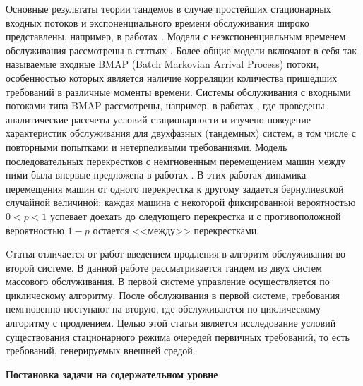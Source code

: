 \documentclass[a4paper,twoside]{article}
\newcommand{\header}[1]{\bigskip\medskip\noindent\textbf{#1}\nopagebreak\bigskip}
\theoremstyle{theorem}
\theoremstyle{remark}
\begin{document}
Основные результаты теории тандемов в случае простейших стационарных входных потоков и экспоненциального времени обслуживания широко представлены, например, в работах \cite{Balsamo:2003, Gnedenko:Konig:1983, Perros:1994}. Модели с неэкспоненциальным временем обслуживания рассмотрены в статьях \cite{Gomez:2002:1, Gomez:2002:2, Gomez:2002:3}. Более общие модели включают в себя так называемые входные BMAP (Batch Markovian Arrival Process) потоки, особенностью которых является наличие корреляции количества пришедших требований в различные моменты времени. Системы обслуживания с входными потоками типа BMAP рассмотрены, например, в работах \cite{Klimenok:Dudin:2005, Klimenok:2010, Klimenok:2015}, где проведены аналитические рассчеты условий стационарности и изучено поведение характеристик обслуживания для двухфазных (тандемных) систем, в том числе с повторными попытками и нетерпеливыми требованиями. 
Модель последовательных перекрестков с немгновенным перемещением машин между ними была впервые предложена в работах \cite{Zorine:2012,Zorine:2013}. В этих работах динамика перемещения машин от одного перекрестка к другому задается бернулиевской случайной величиной: каждая машина с некоторой фиксированной вероятностью $0<p<1$ успевает доехать до следующего перекрестка и с противоположной вероятностью $1-p$ остается <<между>> перекрестками.

Cтатья \cite{Kocheganov:2017:1} отличается от работ  \cite{Zorine:2012,Zorine:2013} введением продления в алгоритм обслуживания во второй системе. 
В данной работе рассматривается тандем из двух систем массового обслуживания. В первой системе управление осуществляется по циклическому алгоритму. После обслуживания в первой системе, требования немгновенно поступают на вторую, где обслуживаются по циклическому алгоритму с продлением. Целью этой статьи является исследование условий существования стационарного режима очередей первичных требований, то есть требований, генерируемых внешней средой.

\header{Постановка задачи на содержательном уровне}
\end{document}
